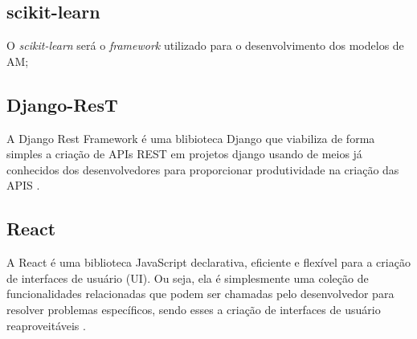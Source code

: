 \subsection{scikit-learn}
O \textit{scikit-learn} será o \textit{framework} utilizado para o desenvolvimento dos modelos de AM;
\subsection{Django-ResT}

A Django Rest Framework é uma blibioteca Django que viabiliza de forma simples a criação de APIs REST em projetos django usando de meios já conhecidos dos desenvolvedores para proporcionar produtividade na criação das APIS \cite{christie2011django}.

\subsection{React}

A React é uma biblioteca JavaScript declarativa, eficiente e flexível para a criação de interfaces de usuário (UI). Ou seja, ela é simplesmente uma coleção de funcionalidades relacionadas que podem ser chamadas pelo desenvolvedor para resolver problemas específicos, sendo esses a criação de interfaces de usuário reaproveitáveis \cite{reactjs}.
